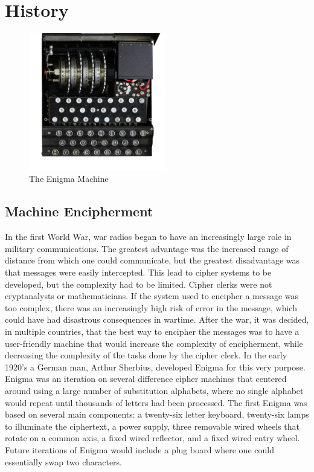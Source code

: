 \chapter{History}\label{chap:history}

\begin{figure}[h!]
\begin{centering}
  \includegraphics[height=6cm]{images/enigma.jpg}
  \caption{The Enigma Machine}
  \label{fig:machine1}
\end{centering}
\end{figure}

\section{Machine Encipherment}
In the first World War, war radios began to have an increasingly large role in military communications. The greatest advantage was the increased range of distance from which one could communicate, but the greatest disadvantage was that messages were easily intercepted. This lead to cipher systems to be developed, but the complexity had to be limited. Cipher clerks were not cryptanalysts or mathematicians. If the system used to encipher a message was too complex, there was an increasingly high risk of error in the message, which could have had disastrous consequences in wartime. After the war, it was decided, in multiple countries, that the best way to encipher the messages was to have a user-friendly machine that would increase the complexity of encipherment, while decreasing the complexity of the tasks done by the cipher clerk. In the early 1920’s a German man, Arthur Sherbius, developed Enigma for this very purpose. Enigma was an iteration on several difference cipher machines that centered around using a large number of substitution alphabets, where no single alphabet would repeat until thousands of letters had been processed. The first Enigma was based on several main components: a twenty-six letter keyboard, twenty-six lamps to illuminate the ciphertext, a power supply, three removable wired wheels that rotate on a common axis, a fixed wired reflector, and a fixed wired entry wheel\cite{rfc01}. Future iterations of Enigma would include a plug board where one could essentially swap two characters.

